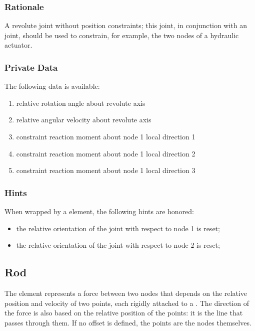 \subsubsection{Rationale}
A revolute joint without position constraints; this joint, in conjunction
with an  joint, should be used to constrain, for example,
the two nodes of a hydraulic actuator.

\subsubsection{Private Data}
The following data is available:
\begin{enumerate}
\item {} relative rotation angle about revolute axis
\item {} relative angular velocity about revolute axis
\item {} constraint reaction moment about node 1 local direction 1
\item {} constraint reaction moment about node 1 local direction 2
\item {} constraint reaction moment about node 1 local direction 3
\end{enumerate}

\subsubsection{Hints}
When wrapped by a  element, the following hints are honored:
\begin{itemize}
\item {} the relative orientation of the joint
with respect to node 1 is reset;
\item {} the relative orientation of the joint
with respect to node 2 is reset;
\end{itemize}





\subsection{Rod}\label{sec:EL:STRUCT:JOINT:ROD}
The  element represents a force between two nodes that depends
on the relative position and velocity of two points, each rigidly attached
to a .
The direction of the force is also based on the relative position
of the points: it is the line that passes through them.
If no offset is defined, the points are the nodes themselves.

